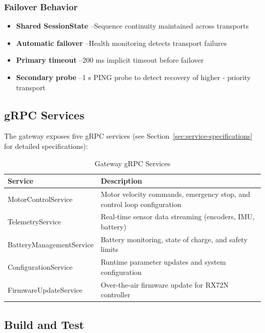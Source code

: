 \subsubsection{Failover Behavior}

\begin{itemize}[leftmargin = 1.5em, topsep = 4pt, itemsep = 2pt]
    \item \textbf{Shared SessionState
}
--Sequence continuity maintained across transports
    \item \textbf{Automatic failover
}
--Health monitoring detects transport failures
    \item \textbf{Primary timeout}
--200 ms implicit timeout before failover
    \item \textbf{Secondary probe}
--1 s PING probe to detect recovery of higher - priority transport
\end{itemize}

\subsection{gRPC Services}

The gateway exposes five gRPC services (see Section~\ref{sec:service-specifications} for detailed specifications):

\begin{table}[H]
\centering
\caption{Gateway gRPC Services}
\label{tab:grpc-services}
\begin{tabular}{| l | p{10cm} |}
\hline
\textbf{Service} & \textbf{Description} \\
\hline
MotorControlService & Motor velocity commands, emergency stop, and control loop configuration \\
TelemetryService & Real-time sensor data streaming (encoders, IMU, battery) \\
BatteryManagementService & Battery monitoring, state of charge, and safety limits \\
ConfigurationService & Runtime parameter updates and system configuration \\
FirmwareUpdateService & Over-the-air firmware update for RX72N controller \\
\hline
\end{tabular}
\end{table}

\subsection{Build and Test}

